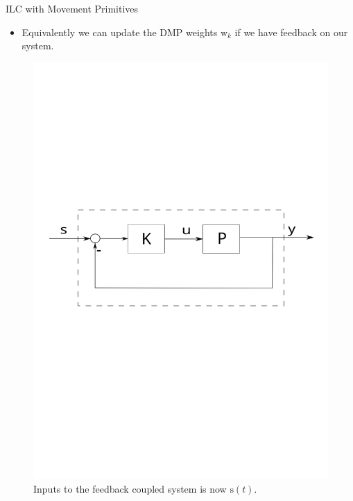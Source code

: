 \documentclass[handout]{beamer}
\newcommand{\boldvec}[1]{\boldsymbol{\mathrm{#1}}}
\let\vec\boldvec
\newcommand{\dmp}{\vec{s}} %
\newcommand{\weights}{\vec{w}} %
\begin{document}
%
\begin{frame}{ILC with Movement Primitives}
\begin{itemize}
\item Equivalently we can update the DMP weights $\weights_k$ if we have feedback on our system.
\end{itemize}
\begin{figure}
\center
\includegraphics[scale=0.5]{fb_plant}			
\caption{Inputs to the feedback coupled system is now $\dmp(t)$.}
\end{figure}
\end{frame}
%
\end{document}
